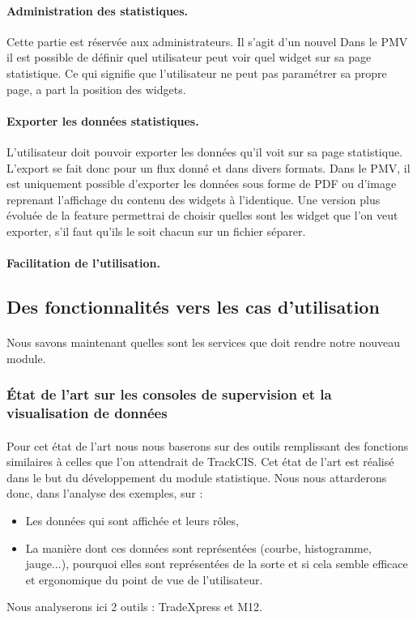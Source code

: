 			\paragraph{Administration des statistiques.}
			Cette partie est réservée aux administrateurs. Il s'agit d'un nouvel Dans le
			PMV il est possible de définir quel utilisateur peut voir quel widget sur sa
			page statistique. Ce qui signifie que l'utilisateur ne peut pas paramétrer
			sa propre page, a part la position des widgets.
			
			\paragraph{Exporter les données statistiques.}
			L'utilisateur doit pouvoir exporter les données qu'il voit sur sa page
			statistique. L'export se fait donc pour un flux donné et dans divers formats.
			Dans le PMV, il est uniquement possible d'exporter les données sous forme de
			PDF ou d'image reprenant l'affichage du contenu des widgets à l'identique.
			Une version plus évoluée de la feature permettrai de choisir quelles sont les
			widget que l'on veut exporter, s'il faut qu'ils le soit chacun sur un fichier
			séparer.
			
			\paragraph{Facilitation de l’utilisation.}
			
	
	\subsection{Des fonctionnalités vers les cas d'utilisation}
		\paragraph{}
		Nous savons maintenant quelles sont les services que doit rendre notre nouveau
		module.
		
		\subsubsection{État de l'art sur les consoles de supervision et la visualisation de données}
			\paragraph{}
			Pour cet état de l’art nous nous baserons sur des outils remplissant des
			fonctions similaires à celles que l’on attendrait de TrackCIS. Cet état de
			l’art est réalisé dans le but du développement du module statistique. Nous
			nous attarderons donc, dans l’analyse des exemples, sur :
			\begin{itemize}
			  \item Les données qui sont affichée et leurs rôles,
			  \item La manière dont ces données sont représentées (courbe, histogramme,
			  jauge...), pourquoi elles sont représentées de la sorte et si cela semble
			  efficace et ergonomique du point de vue de l’utilisateur.
			\end{itemize}
			Nous analyserons ici 2 outils : TradeXpress et M12.
			
